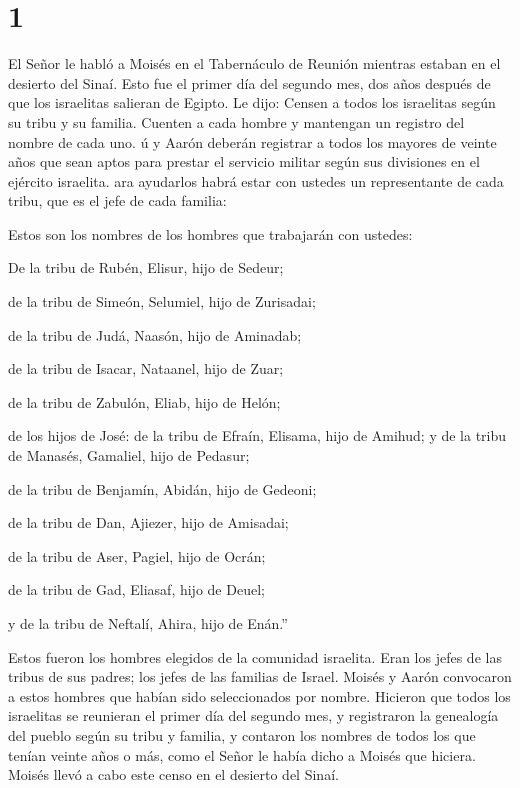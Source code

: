 \hypertarget{section}{%
\section{1}\label{section}}

 El Señor le habló a Moisés en el Tabernáculo de Reunión
mientras estaban en el desierto del Sinaí. Esto fue el primer día del
segundo mes, dos años después de que los israelitas salieran de Egipto.
Le dijo:  Censen a todos los israelitas según su tribu y su
familia. Cuenten a cada hombre y mantengan un registro del nombre de
cada uno.  ú y Aarón deberán registrar a todos los mayores
de veinte años que sean aptos para prestar el servicio militar según sus
divisiones en el ejército israelita.  ara ayudarlos habrá
estar con ustedes un representante de cada tribu, que es el jefe de cada
familia:

 Estos son los nombres de los hombres que trabajarán con
ustedes:

De la tribu de Rubén, Elisur, hijo de Sedeur;

 de la tribu de Simeón, Selumiel, hijo de Zurisadai;

 de la tribu de Judá, Naasón, hijo de Aminadab;

 de la tribu de Isacar, Nataanel, hijo de Zuar;

 de la tribu de Zabulón, Eliab, hijo de Helón;

 de los hijos de José: de la tribu de Efraín, Elisama, hijo
de Amihud; y de la tribu de Manasés, Gamaliel, hijo de Pedasur;

 de la tribu de Benjamín, Abidán, hijo de Gedeoni;

 de la tribu de Dan, Ajiezer, hijo de Amisadai;

 de la tribu de Aser, Pagiel, hijo de Ocrán;

 de la tribu de Gad, Eliasaf, hijo de Deuel;

 y de la tribu de Neftalí, Ahira, hijo de Enán.''

 Estos fueron los hombres elegidos de la comunidad
israelita. Eran los jefes de las tribus de sus padres; los jefes de las
familias de Israel.  Moisés y Aarón convocaron a estos
hombres que habían sido seleccionados por nombre.  Hicieron
que todos los israelitas se reunieran el primer día del segundo mes, y
registraron la genealogía del pueblo según su tribu y familia, y
contaron los nombres de todos los que tenían veinte años o más,
 como el Señor le había dicho a Moisés que hiciera. Moisés
llevó a cabo este censo en el desierto del Sinaí.

